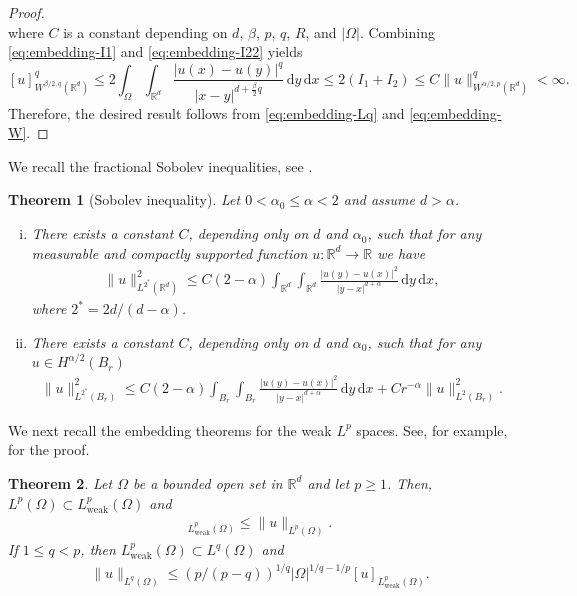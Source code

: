 \documentclass[reqno]{amsart}
\theoremstyle{plain}
\newtheorem{theorem}{Theorem}[section]
\theoremstyle{definition}
\numberwithin{equation}{section}
\newcommand{\R}{\mathbb{R}}
\newcommand{\Rd}{\mathbb{R}^d}
\newcommand{\dx} {\, \mathrm{d}x}
\newcommand{\dy} {\, \mathrm{d}y}
\begin{document}
\begin{proof}
\begin{equation}
\end{equation}
where $C$ is a constant depending on $d$, $\beta$, $p$, $q$, $R$, and $|\Omega|$. Combining \eqref{eq:embedding-I1} and \eqref{eq:embedding-I22} yields
\begin{equation} \label{eq:embedding-W}
[u]_{W^{\beta/2,q}(\Rd)}^{q} \leq 2 \int_{\Omega} \int_{\Rd} \frac{|u(x)-u(y)|^{q}}{|x-y|^{d+\frac{\beta}{2}q}} \dy \dx \leq 2(I_{1} + I_{2}) \leq C \|u\|_{W^{\alpha/2, p}(\Rd)}^{q} < \infty.
\end{equation}
Therefore, the desired result follows from \eqref{eq:embedding-Lq} and \eqref{eq:embedding-W}.
\end{proof}

We recall the fractional Sobolev inequalities, see \cite{BBM02, MaSh02, CoTa04}.

\begin{theorem} [Sobolev inequality] \label{thm:Sobolev}
Let $0<\alpha_0 \leq \alpha<2$ and assume $d > \alpha$.
\begin{enumerate} [(i)]
\item
There exists a constant $C$,
depending only on $d$ and $\alpha_0$, such that for any measurable and compactly 
supported function $u : \Rd \rightarrow \R$ we have
\begin{align*}
\|u\|_{L^{2^\ast} (\Rd)}^2 \leq C(2-\alpha) \int_{\Rd} \int_{\Rd} 
\frac{|u(y) - u(x)|^2}{|y-x|^{d+\alpha}} \dy \dx,
\end{align*}
where $2^\ast = 2d / (d-\alpha)$.

\item
There exists a constant $C$,
depending only on $d$ and $\alpha_0$, such that for any $u \in H^{\alpha/2}(B_r)$
\begin{align*}
\|u\|_{L^{2^\ast} (B_r)}^2 \leq C(2-\alpha) \int_{B_r} \int_{B_r} \frac{|u(y) - u(x)|^2}{|y-x|^{d+\alpha}} \dy \dx + Cr^{-\alpha} \| u\|_{L^2(B_r)}^2.
\end{align*}
\end{enumerate}
\end{theorem}

We next recall the embedding theorems for the weak $L^p$ spaces. See, for example, \cite[Theorem 2.18.8]{KJF77} for the proof.

\begin{theorem}
Let $\Omega$ be a bounded open set in $\Rd$ and let $p \geq 1$. Then, $L^p(\Omega) \subset L^p_\mathrm{weak}(\Omega)$ and
\begin{align*}
[u]_{L^p_\mathrm{weak}(\Omega)} \leq \|u\|_{L^p(\Omega)}.
\end{align*}
If $1 \leq q <p$, then $L^p_\mathrm{weak}(\Omega) \subset L^q (\Omega)$ and
\begin{align} \label{eq:weak_Lq_embedding}
\|u\|_{L^q(\Omega)} \leq \left( p/(p-q) \right)^{1/q} |\Omega|^{1/q-1/p} [u]_{L^p_\mathrm{weak}(\Omega)}.
\end{align}
\end{theorem}
\end{document}
